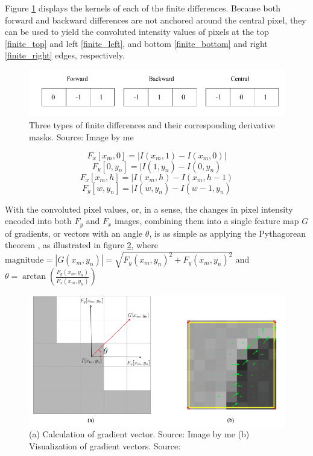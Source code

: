 Figure \ref{fig:finite_differences} displays the kernels of each of the finite differences. Because both forward and backward differences are not anchored around the central pixel, they can be used to yield the convoluted intensity values of pixels at the top \ref{finite_top} and left \ref{finite_left}, and bottom \ref{finite_bottom} and right \ref{finite_right} edges, respectively.

\begin{figure}
    \centering
    \includegraphics[width=0.75\linewidth]{images/finite_differences.png}
    \caption{Three types of finite differences and their corresponding derivative masks. Source: Image by me}
    \label{fig:finite_differences}
\end{figure}

\begin{equation}
    \label{finite_top}
    F_{x}[x_{m},0] =  | I(x_{m},1)-I(x_{m},0) | 
\end{equation}
\begin{equation}
    \label{finite_left}
    F_{y}[0,y_{n}] =  | I(1,y_{n})-I(0,y_{n}) 
\end{equation}
\begin{equation}
    \label{finite_bottom}
    F_{x}[x_{m},h] =  | I(x_{m},h)-I(x_{m},h-1) 
\end{equation}
\begin{equation}
    \label{finite_right}
    F_{y}[w,y_{n}] =  | I(w,y_{n})-I(w-1,y_{n}) 
\end{equation}

With the convoluted pixel values, or, in a sense, the changes in pixel intensity encoded into both $F_y$ and $F_x$ images, combining them into a single feature map $G$ of gradients, or vectors with an angle $\theta$, is as simple as applying the Pythagorean theorem \cite{shidlovskiy_2020_reducing}, as illustrated in figure \ref{fig:pythagorean}, where $ \text{magnitude} = | G(x_{m},y_{n}) | = \sqrt{ F_{y}(x_{m},y_{n})^2+F_{y}(x_{m},y_{n})^2 }$ and $\theta = \arctan \left( \frac{F_{y}(x_{m},y_{n})}{F_{x}(x_{m},y_{n})} \right) $

\begin{figure}
    \centering
    \includegraphics[width=0.75\linewidth]{images/pythagorean.png}
    \caption{(a) Calculation of gradient vector. Source: Image by me (b) Visualization of gradient vectors. Source: \cite{shidlovskiy_2020_reducing}}
    \label{fig:pythagorean}
\end{figure}

